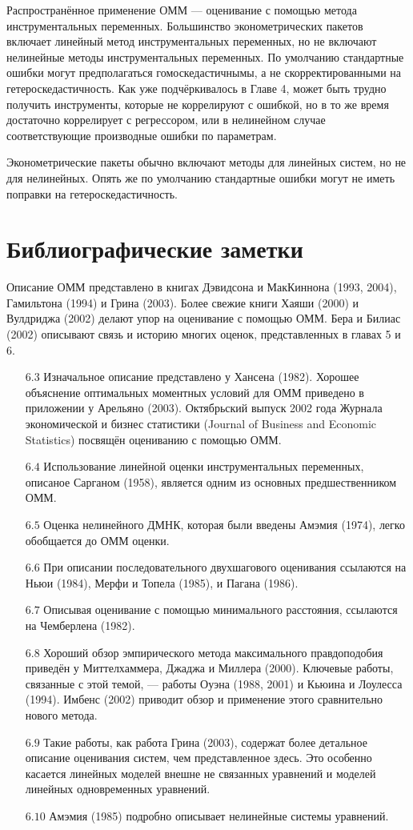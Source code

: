 Распространённое применение ОММ --- оценивание с помощью метода инструментальных переменных. Большинство эконометрических пакетов включает линейный метод инструментальных переменных, но не включают нелинейные методы инструментальных переменных. По умолчанию стандартные ошибки могут предполагаться гомоскедастичнымы, а не скорректированными на гетероскедастичность. Как уже подчёркивалось в Главе 4, может быть трудно получить инструменты, которые не коррелируют с ошибкой, но в то же время достаточно коррелирует с регрессором, или в нелинейном случае соответствующие производные ошибки по параметрам.

Эконометрические пакеты обычно включают методы для  линейных систем, но не для  нелинейных. Опять же по умолчанию стандартные ошибки могут не иметь поправки на гетероскедастичность.

\section{Библиографические заметки}

Описание ОММ представлено в книгах Дэвидсона и МакКиннона (1993, 2004), Гамильтона (1994) и Грина (2003). Более свежие книги Хаяши (2000) и Вулдриджа (2002) делают упор на оценивание с помощью ОММ. Бера и Билиас (2002) описывают связь и историю многих оценок, представленных в главах 5 и 6.

\begin{itemize}
\item [$6.3$] Изначальное описание представлено у Хансена (1982). Хорошее объяснение оптимальных моментных условий для ОММ приведено в приложении у Арельяно (2003). Октябрьский выпуск 2002 года Журнала экономической и бизнес статистики (Journal of Business and Economic Statistics) посвящён оцениванию с помощью ОММ.
\item [$6.4$] Использование линейной оценки инструментальных переменных, описаное Сарганом (1958), является одним из основных предшественником ОММ.
\item [$6.5$] Оценка нелинейного ДМНК, которая были введены Амэмия (1974), легко обобщается до ОММ оценки.
\item [$6.6$] При описании последовательного двухшагового оценивания ссылаются на Ньюи (1984), Мерфи и
Топела (1985), и Пагана (1986).
\item [$6.7$] Описывая оценивание с помощью минимального расстояния, ссылаются на Чемберлена (1982).
\item [$6.8$] Хороший обзор эмпирического метода максимального правдоподобия приведён у Миттелхаммера, Джаджа и Миллера (2000). Ключевые работы, связанные с этой темой, --- работы Оуэна (1988, 2001) и Кьюина и Лоулесса (1994). Имбенс (2002) приводит обзор и применение этого сравнительно нового метода.
\item [$6.9$] Такие работы, как работа Грина (2003), содержат более детальное описание оценивания систем, чем  представленное здесь. Это особенно касается линейных моделей внешне не связанных уравнений и моделей линейных одновременных уравнений.
\item [$6.10$] Амэмия (1985) подробно описывает нелинейные системы уравнений.
\end{itemize}

